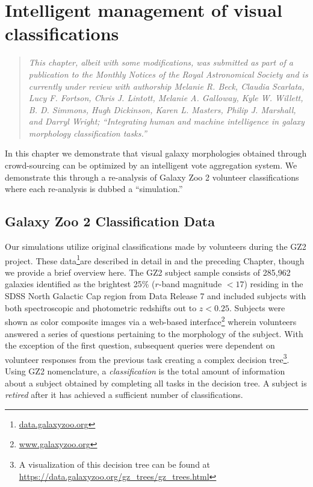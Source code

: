 
\chapter{Intelligent management of visual classifications}
\label{chap:3}

\begin{quote}
\emph{This chapter, albeit with some modifications, was submitted as part of a publication to the Monthly Notices of the Royal Astronomical Society and is currently under review with authorship Melanie R. Beck, Claudia Scarlata, Lucy F. Fortson, Chris J. Lintott, Melanie A. Galloway, Kyle W. Willett, B. D. Simmons, Hugh Dickinson, Karen L. Masters, Philip J. Marshall, and Darryl Wright; ``Integrating human and machine intelligence in galaxy morphology classification tasks.''}\\
\end{quote}


In this chapter we demonstrate that visual galaxy morphologies obtained through crowd-sourcing can be optimized by an intelligent vote aggregation system. We demonstrate this through a re-analysis of Galaxy Zoo 2 volunteer classifications where each re-analysis is dubbed a ``simulation.''

\section{Galaxy Zoo 2 Classification Data} \label{chap3: data}

Our simulations utilize original classifications made by volunteers during the GZ2 project. These data\footnote{\url{data.galaxyzoo.org}}are described in detail in \cite{Willett2013} and the preceding Chapter, though we provide a brief overview here.  The GZ2 subject sample consists of 285,962 galaxies identified as the brightest 25\% ($r$-band magnitude $< 17$) residing in the SDSS North Galactic Cap region from Data Release 7 and included subjects with both spectroscopic and photometric redshifts out to $z < 0.25$. Subjects were shown as color composite images via a web-based interface\footnote{\url{www.galaxyzoo.org}} wherein volunteers answered a series of questions pertaining to the morphology of the subject. With the exception of the first question, subsequent queries were dependent on volunteer responses from the previous task creating a complex decision tree\footnote{A visualization of this decision tree can be found at \url{https://data.galaxyzoo.org/gz_trees/gz_trees.html}}. Using GZ2 nomenclature, a \textit{classification} is the total amount of information about a subject obtained by completing all tasks in the decision tree. A subject is \textit{retired} after it has achieved a sufficient number of classifications.


